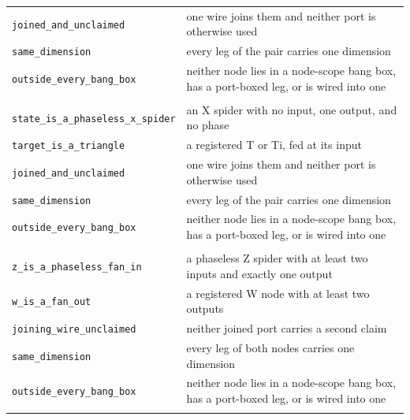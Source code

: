\begin{xltabular}{\textwidth}{@{}>{\raggedright\arraybackslash}p{0.42\textwidth}>{\raggedright\arraybackslash}X@{}}
\quad\texttt{joined\_\allowbreak{}and\_\allowbreak{}unclaimed} & one wire joins them and neither port is otherwise used \\
\quad\texttt{same\_\allowbreak{}dimension} & every leg of the pair carries one dimension \\
\quad\texttt{outside\_\allowbreak{}every\_\allowbreak{}bang\_\allowbreak{}box} & neither node lies in a node-scope bang box, has a port-boxed leg, or is wired into one \\
\midrule
{}\\
\quad\texttt{state\_\allowbreak{}is\_\allowbreak{}a\_\allowbreak{}phaseless\_\allowbreak{}x\_\allowbreak{}spider} & an X spider with no input, one output, and no phase \\
\quad\texttt{target\_\allowbreak{}is\_\allowbreak{}a\_\allowbreak{}triangle} & a registered T or Ti, fed at its input \\
\quad\texttt{joined\_\allowbreak{}and\_\allowbreak{}unclaimed} & one wire joins them and neither port is otherwise used \\
\quad\texttt{same\_\allowbreak{}dimension} & every leg of the pair carries one dimension \\
\quad\texttt{outside\_\allowbreak{}every\_\allowbreak{}bang\_\allowbreak{}box} & neither node lies in a node-scope bang box, has a port-boxed leg, or is wired into one \\
\midrule
{}\\
\quad\texttt{z\_\allowbreak{}is\_\allowbreak{}a\_\allowbreak{}phaseless\_\allowbreak{}fan\_\allowbreak{}in} & a phaseless Z spider with at least two inputs and exactly one output \\
\quad\texttt{w\_\allowbreak{}is\_\allowbreak{}a\_\allowbreak{}fan\_\allowbreak{}out} & a registered W node with at least two outputs \\
\quad\texttt{joining\_\allowbreak{}wire\_\allowbreak{}unclaimed} & neither joined port carries a second claim \\
\quad\texttt{same\_\allowbreak{}dimension} & every leg of both nodes carries one dimension \\
\quad\texttt{outside\_\allowbreak{}every\_\allowbreak{}bang\_\allowbreak{}box} & neither node lies in a node-scope bang box, has a port-boxed leg, or is wired into one \\
\midrule
{}\\

\end{xltabular}
